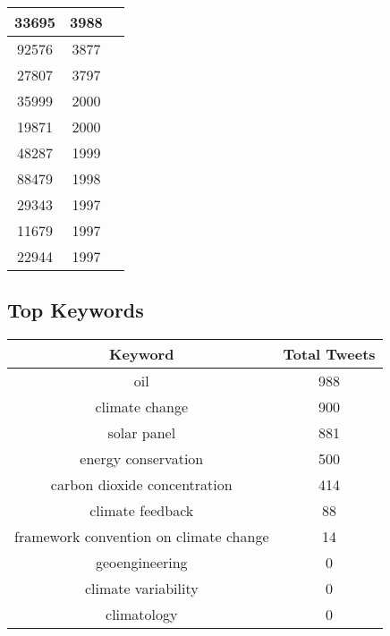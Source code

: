 \documentclass{article}\usepackage[T1]{fontenc}
\begin{document}
\begin{tabular}{|c|c|c|}
 \hline
33695 & 3988\\ 
 \hline
92576 & 3877\\ 
 \hline
27807 & 3797\\ 
 \hline
35999 & 2000\\ 
 \hline
19871 & 2000\\ 
 \hline
48287 & 1999\\ 
 \hline
88479 & 1998\\ 
 \hline
29343 & 1997\\ 
 \hline
11679 & 1997\\ 
 \hline
22944 & 1997\\ 
 \hline
\end{tabular}\subsection*{Top Keywords}\begin{tabular}{|c|c|}         \hline         Keyword & Total Tweets \\ 
 \hline
oil & 988\\ 
 \hline
climate change & 900\\ 
 \hline
solar panel & 881\\ 
 \hline
energy conservation & 500\\ 
 \hline
carbon dioxide concentration & 414\\ 
 \hline
climate feedback & 88\\ 
 \hline
framework convention on climate change & 14\\ 
 \hline
geoengineering & 0\\ 
 \hline
climate variability & 0\\ 
 \hline
climatology & 0\\ 
 \hline
\end{tabular}
\end{document}
